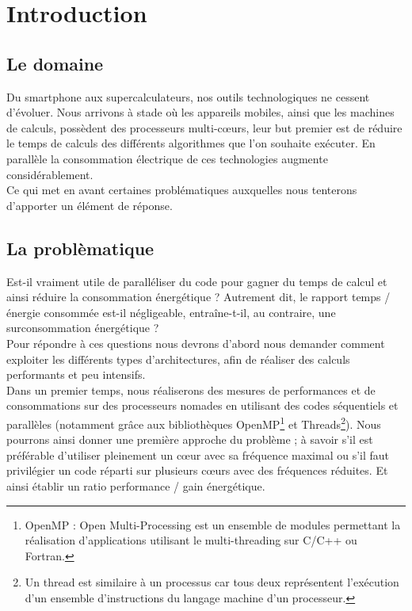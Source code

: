 \chapter{Introduction}

	\section{Le domaine}
		Du smartphone aux supercalculateurs, nos outils technologiques ne cessent d'évoluer. Nous arrivons à stade où les appareils mobiles, ainsi que les machines de calculs, possèdent des processeurs multi-c\oe{}urs, leur but premier est de réduire le temps de calculs des différents algorithmes que l'on souhaite exécuter. En parallèle la consommation électrique de ces technologies augmente considérablement. \\
 		Ce qui met en avant certaines problématiques auxquelles nous tenterons d'apporter un élément de réponse. 

	\section{La problèmatique}
		Est-il vraiment utile de paralléliser du code pour gagner du temps de calcul et ainsi réduire la consommation énergétique ? Autrement dit, le rapport temps / énergie consommée est-il négligeable, entraîne-t-il, au contraire, une surconsommation énergétique ? \\

		Pour répondre à ces questions nous devrons d'abord nous demander comment exploiter les différents types d'architectures, afin de réaliser des calculs performants et peu intensifs.\\

		Dans un premier temps, nous réaliserons des mesures de performances et de consommations sur des processeurs nomades en utilisant des codes séquentiels et parallèles (notamment grâce aux bibliothèques OpenMP\footnote{OpenMP : Open Multi-Processing est un ensemble de modules permettant la réalisation d'applications utilisant le multi-threading sur C/C++ ou Fortran.} et Threads\footnote{Un thread est similaire à un processus car tous deux représentent l'exécution d'un ensemble d'instructions du langage machine d'un processeur.}). Nous pourrons ainsi donner une première approche du problème ; à savoir s'il est préférable d'utiliser pleinement un c\oe{}ur avec sa fréquence maximal ou s'il faut privilégier un code réparti sur plusieurs c\oe{}urs avec des fréquences réduites. Et ainsi établir un ratio performance / gain énergétique.\\

